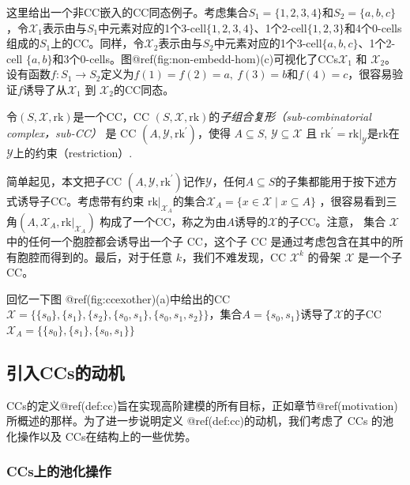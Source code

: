 \documentclass[
  12pt,
]{krantz}
\begin{document}
\label{homomorphism}
这里给出一个非CC嵌入的CC同态例子。考虑集合\(S_1 = \{1, 2, 3,4\}\)和\(S_2 = \{a, b, c\}\)，令\(\mathcal{X}_1\)表示由与\(S_1\)中元素对应的1个3-cell\(\{1,2,3,4\}\)、1个2-cell\(\{1,2,3\}\)和4个0-cells组成的\(S_1\)上的CC。同样，令\(\mathcal{X}_2\)表示由与\(S_2\)中元素对应的1个3-cell\(\{a,b,c\}\)、1个2-cell
\(\{a,b\}\)和3个0-cells。图@ref(fig:non-embedd-hom)(c)可视化了CCs\(\mathcal{X}_1\)
和
\(\mathcal{X}_2\)。设有函数\(f \colon S_1 \to S_2\)定义为\(f(1) = f(2) = a,~f(3) = b\)和\(f(4) = c\)，很容易验证\(f\)诱导了从\(\mathcal{X}_1\)
到 \(\mathcal{X}_2\)的CC同态。

\label{sub-cc}
令\((S,\mathcal{X}, \mbox{rk})\)是一个CC，CC
\((S,\mathcal{X}, \mbox{rk})\)的\emph{子组合复形（sub-combinatorial
complex，sub-CC）} 是 CC \((A,\mathcal{Y},\mbox{rk}^{\prime})\)，使得
\(A\subseteq S\), \(\mathcal{Y}\subseteq\mathcal{X}\) 且
\(\mbox{rk}^{\prime} = \mbox{rk}|_{\mathcal{Y}}\)是\(\mbox{rk}\)在\(\mathcal{Y}\)上的约束（restriction）.

简单起见，本文把子CC
\((A,\mathcal{Y},\mbox{rk}^{\prime})\)记作\(\mathcal{Y}\)，任何\(A \subseteq S\)的子集都能用于按下述方式诱导子CC。考虑带有约束
\(\mbox{rk}|_{\mathcal{X}_A}\)的集合\(\mathcal{X}_A = \{x \in \mathcal{X}  \mid x \subseteq A\}\)
，很容易看到三角\((A,\mathcal{X}_A,\mbox{rk}|_{\mathcal{X}_A})\)
构成了一个CC，称之为由\(A\)诱导的\(\mathcal{X}\)的子CC。注意， 集合
\(\mathcal{X}\) 中的任何一个胞腔都会诱导出一个子 CC，这个子 CC
是通过考虑包含在其中的所有胞腔而得到的。最后，对于任意
\(k\)，我们不难发现，CC \(\mathcal{X}^{k}\) 的骨架 \(\mathcal{X}\)
是一个子 CC。

\label{sub-cc-ex}
回忆一下图 @ref(fig:ccexother)(a)中给出的CC
\(\mathcal{X}= \{\{s_0\}, \{s_1\}, \{s_2\}, \{s_0, s_1\}, \{s_0, s_1, s_2\}\}\)，集合\(A = \{s_0, s_1\}\)诱导了\(\mathcal{X}\)的子CC\(\mathcal{X}_A = \{\{s_0\}, \{s_1\}, \{s_0, s_1\}\}\)

\subsection{引入CCs的动机}\label{motivation-for-ccs}

CCs的定义@ref(def:cc)旨在实现高阶建模的所有目标，正如章节@ref(motivation)所概述的那样。为了进一步说明定义
@ref(def:cc)的动机，我们考虑了 CCs 的池化操作以及
CCs在结构上的一些优势。

\subsubsection{CCs上的池化操作}\label{pooling-operations-on-ccs}
\end{document}
